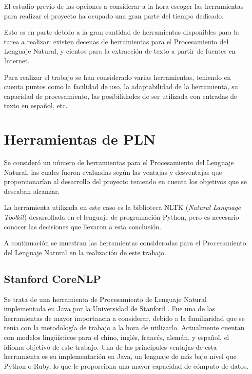 \lhead{\emph{\ChapterOne{}}}
El estudio previo de las opciones a considerar a la hora escoger las herramientas para realizar el proyecto ha ocupado una gran parte del tiempo dedicado.

Esto es en parte debido a la gran cantidad de herramientas disponibles para la tarea a realizar: existen decenas de herramientas para el Procesamiento del Lenguaje Natural, y cientos para la extracción de texto a partir de fuentes en Internet.

Para realizar el trabajo se han considerado varias herramientas, teniendo en cuenta puntos como la facilidad de uso, la adaptabilidad de la herramienta, su capacidad de procesamiento, las posibilidades de ser utilizada con entradas de texto en español, etc.

\section{Herramientas de PLN}

Se consideró un número de herramientas para el Procesamiento del Lenguaje Natural, las cuales fueron evaluadas según las ventajas y desventajas que proporcionarían al desarrollo del proyecto teniendo en cuenta los objetivos que se deseaban alcanzar.

La herramienta utilizada en este caso es la biblioteca NLTK (\textit{Natural Language Toolkit}) desarrollada en el lenguaje de programación Python, pero es necesario conocer las decisiones que llevaron a esta conclusión.

A continuación se muestran las herramientas consideradas para el Procesamiento del Lenguaje Natural en la realización de este trabajo.

\subsection{Stanford CoreNLP}

Se trata de una herramienta de Procesamiento de Lenguaje Natural implementada en Java por la Universidad de Stanford \cite{stanford-corenlp-paper}.
%
%
Fue una de las herramientas de mayor importancia a considerar, debido a la familiaridad que se tenía con la metodología de trabajo a la hora de utilizarlo.
%
Actualmente cuentan con modelos lingüísticos para el chino, inglés, francés, alemán, y español, el idioma objetivo de este trabajo.
%
Una de las principales ventajas de esta herramienta es su implementación en Java, un lenguaje de más bajo nivel que Python o Ruby, lo que le proporciona una mayor capacidad de cómputo de datos.

